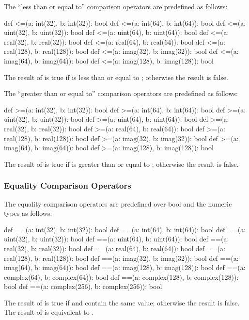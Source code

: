 The ``less than or equal to'' comparison operators are predefined as
follows:
\begin{chapel}
def <=(a: int(32), b: int(32)): bool
def <=(a: int(64), b: int(64)): bool
def <=(a: uint(32), b: uint(32)): bool
def <=(a: uint(64), b: uint(64)): bool
def <=(a: real(32), b: real(32)): bool
def <=(a: real(64), b: real(64)): bool
def <=(a: real(128), b: real(128)): bool
def <=(a: imag(32), b: imag(32)): bool
def <=(a: imag(64), b: imag(64)): bool
def <=(a: imag(128), b: imag(128)): bool
\end{chapel}
The result of  is true if  is less than or equal
to ; otherwise the result is false.

The ``greater than or equal to'' comparison operators are predefined
as follows:
\begin{chapel}
def >=(a: int(32), b: int(32)): bool
def >=(a: int(64), b: int(64)): bool
def >=(a: uint(32), b: uint(32)): bool
def >=(a: uint(64), b: uint(64)): bool
def >=(a: real(32), b: real(32)): bool
def >=(a: real(64), b: real(64)): bool
def >=(a: real(128), b: real(128)): bool
def >=(a: imag(32), b: imag(32)): bool
def >=(a: imag(64), b: imag(64)): bool
def >=(a: imag(128), b: imag(128)): bool
\end{chapel}
The result of  is true if  is greater than or
equal to ; otherwise the result is false.

\subsubsection{Equality Comparison Operators}
\label{Equality_Comparison_Operators}

The equality comparison operators are predefined over bool and the
numeric types as follows:
\begin{chapel}
def ==(a: int(32), b: int(32)): bool
def ==(a: int(64), b: int(64)): bool
def ==(a: uint(32), b: uint(32)): bool
def ==(a: uint(64), b: uint(64)): bool
def ==(a: real(32), b: real(32)): bool
def ==(a: real(64), b: real(64)): bool
def ==(a: real(128), b: real(128)): bool
def ==(a: imag(32), b: imag(32)): bool
def ==(a: imag(64), b: imag(64)): bool
def ==(a: imag(128), b: imag(128)): bool
def ==(a: complex(64), b: complex(64)): bool
def ==(a: complex(128), b: complex(128)): bool
def ==(a: complex(256), b: complex(256)): bool
\end{chapel}
The result of  is true if  and  contain
the same value; otherwise the result is false.  The result of  is equivalent to .

